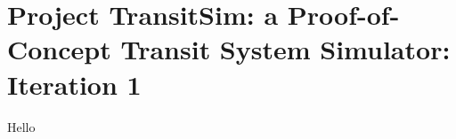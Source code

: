 \hypertarget{index_intro_sec}{}\section{Project Transit\+Sim\+: a Proof-\/of-\/\+Concept Transit System Simulator\+: Iteration 1}\label{index_intro_sec}
Hello 
